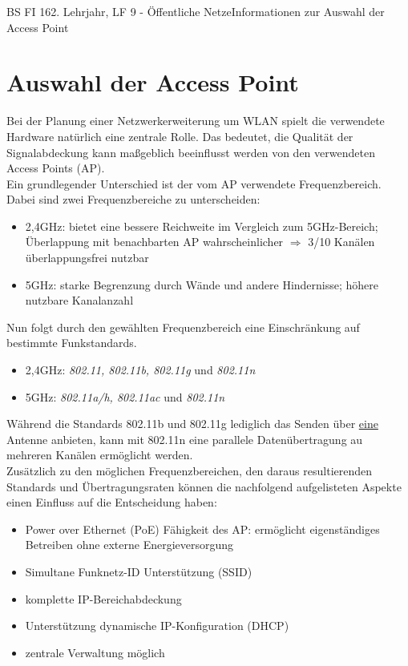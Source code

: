 \documentclass[11pt,twocolumn,oneside,openany,headings=optiontotoc,11pt,numbers=noenddot]{article}
\begin{document}
	\begin{worksheet}{BS FI 16}{2. Lehrjahr, LF 9 - Öffentliche Netze}{Informationen zur Auswahl der Access Point}
		\section{Auswahl der Access Point}
		Bei der Planung einer Netzwerkerweiterung um WLAN spielt die verwendete Hardware natürlich eine zentrale Rolle. Das bedeutet, die Qualität der Signalabdeckung kann maßgeblich beeinflusst werden von den verwendeten Access Points (AP).\\
		Ein grundlegender Unterschied ist der vom AP verwendete Frequenzbereich. Dabei sind zwei Frequenzbereiche zu unterscheiden:
		\begin{itemize}
			\item 2,4GHz: bietet eine bessere Reichweite im Vergleich zum 5GHz-Bereich; Überlappung mit benachbarten AP wahrscheinlicher $\Rightarrow$ 3/10 Kanälen überlappungsfrei nutzbar
			\item 5GHz: starke Begrenzung durch Wände und andere Hindernisse; höhere nutzbare Kanalanzahl
		\end{itemize}
		Nun folgt durch den gewählten Frequenzbereich eine Einschränkung auf bestimmte Funkstandards.
		\begin{itemize}
			\item 2,4GHz: \textit{802.11, 802.11b, 802.11g} und \textit{802.11n}
			\item 5GHz: \textit{802.11a/h, 802.11ac} und \textit{802.11n}
		\end{itemize}
		Während die Standards 802.11b und 802.11g lediglich das Senden über \underline{eine} Antenne anbieten, kann mit 802.11n eine parallele Datenübertragung au mehreren Kanälen ermöglicht werden.\\
		Zusätzlich zu den möglichen Frequenzbereichen, den daraus resultierenden Standards und Übertragungsraten können die nachfolgend aufgelisteten Aspekte einen Einfluss auf die Entscheidung haben:
		\begin{itemize}
			\item Power over Ethernet (PoE) Fähigkeit des AP: ermöglicht eigenständiges Betreiben ohne externe Energieversorgung
			\item Simultane Funknetz-ID Unterstützung (SSID)
			\item komplette IP-Bereichabdeckung
			\item Unterstützung dynamische IP-Konfiguration (DHCP)
			\item zentrale Verwaltung möglich

\end{itemize}
\end{worksheet}
\end{document}
